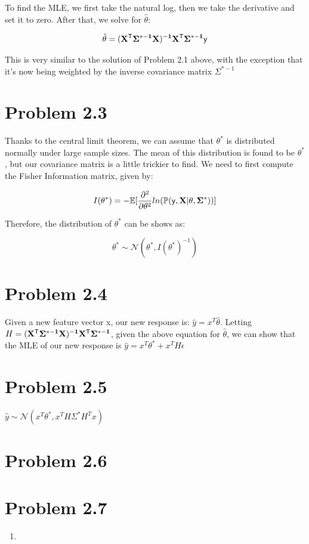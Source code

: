 \documentclass{article}
\begin{document}
To find the MLE, we first take the natural log, then we take the derivative and set it to zero. After that, we solve for $\hat{\theta}$:

\begin{align*}
  \hat{\theta} = (\bf{X}^{\sf{T}}\Sigma^{*-1}\bf{X})^{-1}\bf{X}^{\sf{T}}\Sigma^{*-1}\bf{\sf{y}}
\end{align*}

This is very similar to the solution of Problem 2.1 above, with the exception that it's now being weighted by the inverse covariance matrix $\Sigma^{*-1}$

\section*{Problem 2.3}

Thanks to the central limit theorem, we can assume that $\theta^*$ is distributed normally under large sample sizes. The mean of this distribution is found to be $\theta^*$, but our covariance matrix is a little trickier to find. We need to first compute the Fisher Information matrix, given by:

\[I(\theta^*) = - \mathbb{E}[\frac{\partial^2}{\partial \theta^2} ln ( \mathbb{P}(\sf{y}, \bf{X} | \theta,\Sigma^{*})) ] \]

Therefore, the distribution of $\theta^*$ can be shows as:

\[\theta^* \sim \mathcal{N}(\theta^*, I(\theta^*)^{-1})\]

\section*{Problem 2.4}

Given a new feature vector x, our new response is: $\hat{y} = x^T\hat{\theta}$. Letting $H = (\bf{X}^{\sf{T}}\Sigma^{*-1}\bf{X})^{-1}\bf{X}^{\sf{T}}\Sigma^{*-1}$, given the above equation for $\hat{\theta}$, we can show that the MLE of our new response is $\hat{y} = x^T\theta^* + x^TH\epsilon$

\section*{Problem 2.5}

$\hat{y} \sim \mathcal{N}(x^T\theta^*, x^TH\Sigma^*H^Tx) $

\section*{Problem 2.6}

\section*{Problem 2.7}
\begin{enumerate}[label=(\alph*)]
  \item 
\end{enumerate}
\end{document}
